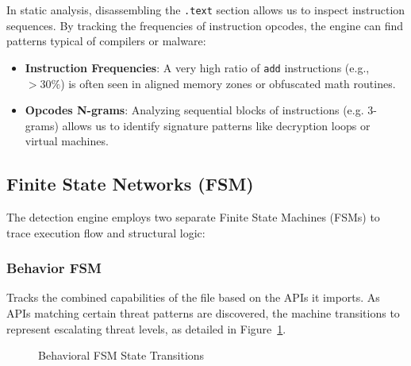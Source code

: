 \documentclass[11pt,a4paper]{article}
\begin{document}
In static analysis, disassembling the \texttt{.text} section allows us to inspect instruction sequences. By tracking the frequencies of instruction opcodes, the engine can find patterns typical of compilers or malware:
\begin{itemize}
    \item \textbf{Instruction Frequencies}: A very high ratio of \texttt{add} instructions (e.g., $>30\%$) is often seen in aligned memory zones or obfuscated math routines.
    \item \textbf{Opcodes N-grams}: Analyzing sequential blocks of instructions (e.g. 3-grams) allows us to identify signature patterns like decryption loops or virtual machines.
\end{itemize}

\subsection{Finite State Networks (FSM)}
The detection engine employs two separate Finite State Machines (FSMs) to trace execution flow and structural logic:

\subsubsection{Behavior FSM}
Tracks the combined capabilities of the file based on the APIs it imports. As APIs matching certain threat patterns are discovered, the machine transitions to represent escalating threat levels, as detailed in Figure~\ref{fig:behavior_fsm}.

\begin{figure}[h]
\centering
{}
\caption{Behavioral FSM State Transitions}
\label{fig:behavior_fsm}
\end{figure}
\end{document}
